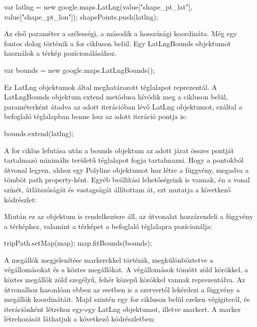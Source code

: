 \begin{cpp}
var latlng = new google.maps.LatLng(value["shape_pt_lat"], value["shape_pt_lon"]);
shapePoints.push(latlng);
\end{cpp}

Az első paraméter a szélességi, a második a hosszúsági koordináta. Még egy fontos dolog történik a for cikluson belül. Egy LatLngBounds objektumot használok a térkép pozícionálásához.

\begin{cpp}
var bounds = new google.maps.LatLngBounds();
\end{cpp}

Ez LatLng objektumok által meghatározott téglalapot reprezentál. A LatLngBounds objektum extend metódusa hívódik meg a cikluson belül, paraméterként átadva az adott iterációban lévő LatLng objektumot, ezáltal a befoglaló téglalapban benne lesz az adott iteráció pontja is:

\begin{cpp}
bounds.extend(latlng);
\end{cpp}

A for ciklus lefutása után a bounds objektum az adott járat összes pontját tartalmazó minimális területű téglalapot fogja tartalmazni.
Hogy a pontokból útvonal legyen, ahhoz egy Polyline objektumot hoz létre a függvény, megadva a tömböt path property-ként. Egyéb beállítási lehetőségeink is vannak, én a vonal színét, átlátszóságát és vastagságát állítottam át, ezt mutatja a következő kódrészlet:


Miután ez az objektum is rendelkezésre áll, az útvonalat hozzárendeli a függvény a térképhez, valamint a térképet a befoglaló téglalapra pozícionálja:

\begin{cpp}
tripPath.setMap(map);
map.fitBounds(bounds);
\end{cpp}

A megállók megjelenítése markerekkel történik, megkülönböztetve a végállomásokat és a köztes megállókat. A végállomások tömött zöld körökkel, a köztes megállók zöld szegélyű, fehér közepű körökkel vannak reprezentálva. Az útvonalhoz hasonlóan ebben az esetben is a szervertől lekérdezi a függvény a megállók koordinátáit. Majd szintén egy for cikluson belül ezeken végigiterál, és iterációnként létrehoz egy-egy LatLng objektumot, illetve markert. A marker létrehozását láthatjuk a következő kódrészletben:

